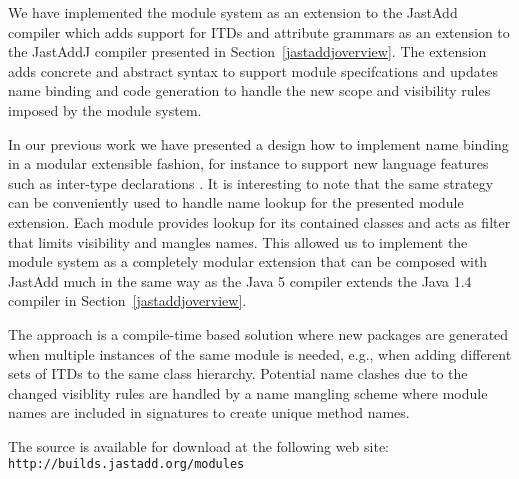 We have implemented the module system as an extension to the JastAdd
compiler which adds support for ITDs and attribute grammars as an extension
to the JastAddJ compiler presented in Section~\ref{jastaddjoverview}. 
The extension adds concrete and abstract syntax to support module
specifcations and updates name binding and code generation to handle the
new scope and visibility rules imposed by the module system. 

In our previous work we have presented a design how to implement name
binding in a modular extensible fashion, for instance to support new
language features such as inter-type declarations
\cite{jastaddjavacompiler}. It is interesting to note that the same
strategy can be conveniently used to handle name lookup for the presented
module extension. Each module provides lookup for its contained classes and
acts as filter that limits visibility and mangles names. This allowed us to
implement the module system as a completely modular extension that can be
composed with JastAdd much in the same way as the Java 5 compiler extends
the Java 1.4 compiler in Section~\ref{jastaddjoverview}.

The approach is a compile-time based solution where new packages are
generated when multiple instances of the same module is needed, e.g., when
adding different sets of ITDs to the same class hierarchy. Potential name
clashes due to the changed visiblity rules are handled by a name mangling
scheme where module names are included in signatures to create unique method
names.

The source is available for download at the following web
site: \texttt{http://builds.jastadd.org/modules}
